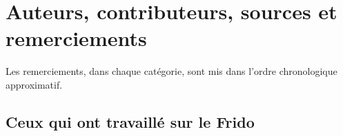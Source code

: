 \section{Auteurs, contributeurs, sources et remerciements}

Les remerciements, dans chaque catégorie, sont mis dans l'ordre chronologique approximatif.

\subsection{Ceux qui ont travaillé sur le Frido}

